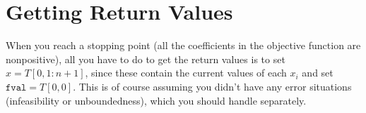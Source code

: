 \section{Getting Return Values}

When you reach a stopping point (all the coefficients in the objective function are nonpositive), all you have to do to get the return values is to set $x = T[0,1:n+1]$, since these contain the current values of each $x_i$ and set $\mathtt{fval} = T[0,0]$. This is of course assuming you didn't have any error situations (infeasibility or unboundedness), which you should handle separately.

